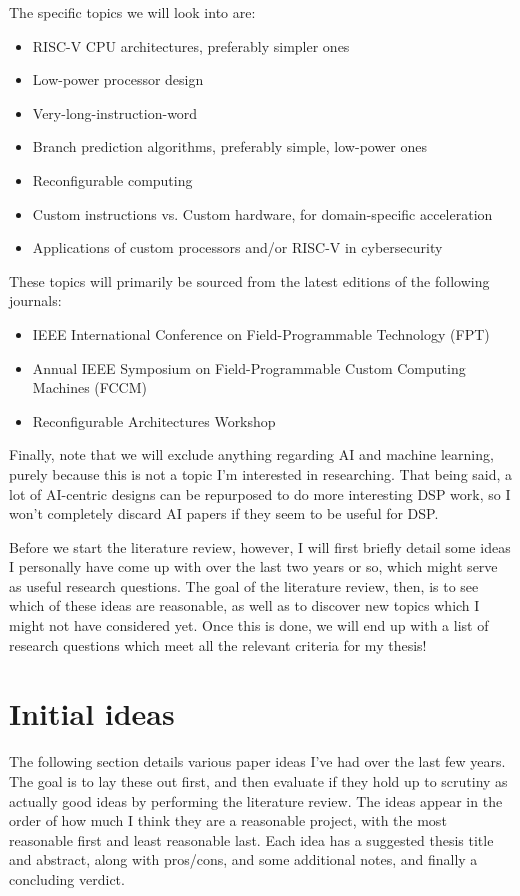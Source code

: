 \documentclass[12pt]{article}
\begin{document}
The specific topics we will look into are:
\begin{itemize}
    \item RISC-V CPU architectures, preferably simpler ones
    \item Low-power processor design
    \item Very-long-instruction-word
    \item Branch prediction algorithms, preferably simple, low-power ones
    \item Reconfigurable computing
    \item Custom instructions vs. Custom hardware, for domain-specific acceleration
    \item Applications of custom processors and/or RISC-V in cybersecurity
\end{itemize}

These topics will primarily be sourced from the latest editions of the following journals:
\begin{itemize}
    \item IEEE International Conference on Field-Programmable Technology (FPT)
    \item Annual IEEE Symposium on Field-Programmable Custom Computing Machines (FCCM) 
    \item Reconfigurable Architectures Workshop
\end{itemize}

Finally, note that we will exclude anything regarding AI and machine learning, purely because this is not
a topic I'm interested in researching. That being said, a lot of AI-centric designs can be repurposed to do
more interesting DSP work, so I won't completely discard AI papers if they seem to be useful for DSP.

Before we start the literature review, however, I will first briefly detail some ideas I personally have
come up with over the last two years or so, which might serve as useful research questions. The goal of the
literature review, then, is to see which of these ideas are reasonable, as well as to discover new topics
which I might not have considered yet. Once this is done, we will end up with a list of research questions
which meet all the relevant criteria for my thesis!

\section{Initial ideas}
The following section details various paper ideas I've had over the last few years. The goal is to lay
these out first, and then evaluate if they hold up to scrutiny as actually good ideas by performing the
literature review. The ideas appear in the order of how much I think they are a reasonable project, with
the most reasonable first and least reasonable last. Each idea has a suggested thesis title and abstract,
along with pros/cons, and some additional notes, and finally a concluding verdict.
\end{document}
